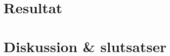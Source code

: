 \documentclass[]{article}
\begin{document}

\section{Resultat}

\section{Diskussion \& slutsatser}

\clearpage
\printbibliography
\end{document}
